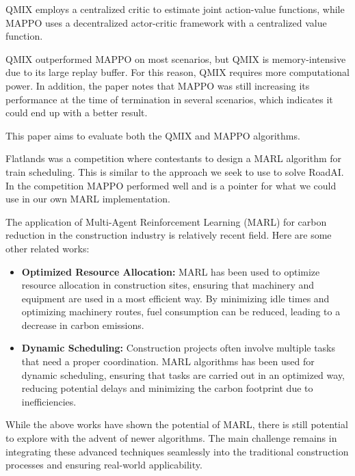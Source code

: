 \documentclass[conference]{IEEEtran}
\begin{document}
QMIX employs a centralized critic to estimate joint action-value functions, while MAPPO uses a decentralized
actor-critic framework with a centralized value function.

QMIX outperformed MAPPO on most scenarios, but QMIX is memory-intensive due to its large replay buffer. For
this reason, QMIX requires more computational power. In addition, the paper notes that MAPPO was still
increasing its performance at the time of termination in several scenarios, which indicates it could end up
with a better result.

This paper aims to evaluate both the QMIX and MAPPO algorithms.


Flatlands\cite{laurent2021flatland} was a competition where contestants to design a MARL algorithm for
train scheduling. This is similar to the approach we seek to use to solve RoadAI.
In the competition MAPPO performed well and is a pointer for what we could use in our own MARL implementation.


The application of Multi-Agent Reinforcement Learning (MARL) for carbon reduction in the construction industry is relatively recent field. Here are some other related works:

\begin{itemize}

  \item \textbf{Optimized Resource Allocation:}
    MARL has been used to optimize resource allocation in construction sites, ensuring that machinery and equipment are used in a most efficient way. By minimizing idle times and optimizing machinery routes, fuel consumption can be reduced, leading to a decrease in carbon emissions\cite{resource_allocation}.

  \item \textbf{Dynamic Scheduling:}
    Construction projects often involve multiple tasks that need a proper coordination. MARL algorithms has been used for dynamic scheduling, ensuring that tasks are carried out in an optimized way, reducing potential delays and minimizing the carbon footprint due to inefficiencies\cite{dynamic_scheduling}.

\end{itemize}

While the above works have shown the potential of MARL, there is still potential to explore with the advent of newer algorithms. The main challenge remains in integrating these advanced techniques seamlessly into the traditional construction processes and ensuring real-world applicability.
\end{document}
